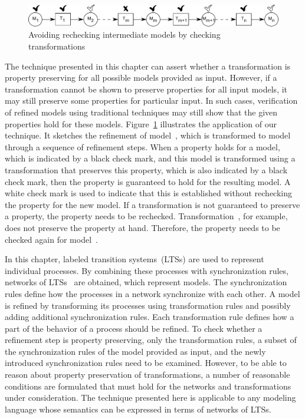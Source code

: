 \begin{figure}[hbt]
\centering
\includegraphics[scale=0.6]{lts-transformation/figs/rechecking-overview}
\caption{Avoiding rechecking intermediate models by checking transformations}
\label{fig:lts-transformation:rechecking}
\end{figure}

The technique presented in this chapter can assert whether a transformation is property preserving for all possible models provided as input.
However, if a transformation cannot be shown to preserve properties for all input models, it may still preserve some properties for particular input.
In such cases, verification of refined models using traditional techniques may still show that the given properties hold for these models.
Figure~\ref{fig:lts-transformation:rechecking} illustrates the application of our technique.
It sketches the refinement of model~, which is transformed to model~ through a sequence of refinement steps.
When a property holds for a model, which is indicated by a black check mark, and this model is transformed using a transformation that preserves this property, which is also indicated by a black check mark, then the property is guaranteed to hold for the resulting model.
A white check mark is used to indicate that this is established without rechecking the property for the new model.
If a transformation is not guaranteed to preserve a property, the property needs to be rechecked.
Transformation~, for example, does not preserve the property at hand.
Therefore, the property needs to be checked again for model~.

In this chapter, labeled transition systems~(LTSs) are used to represent individual processes.
By combining these processes with synchronization rules, networks of LTSs~\cite{lang05} are obtained, which represent models.
The synchronization rules define how the processes in a network synchronize with each other.
A model is refined by transforming its processes using transformation rules and possibly adding additional synchronization rules.
Each transformation rule defines how a part of the behavior of a process should be refined.
To check whether a refinement step is property preserving, only the transformation rules, a subset of the synchronization rules of the model provided as input, and the newly introduced synchronization rules need to be examined.
However, to be able to reason about property preservation of transformations, a number of reasonable conditions are formulated that must hold for the networks and transformations under consideration.
The technique presented here is applicable to any modeling language whose semantics can be expressed in terms of networks of LTSs.

